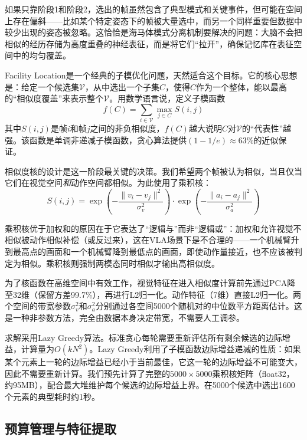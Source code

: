 \documentclass[11pt,a4paper,fontset=none]{ctexart}
\begin{document}
如果只靠阶段1和阶段2，选出的帧虽然包含了典型模式和关键事件，但可能在空间上存在偏斜——比如某个特定姿态下的帧被大量选中，而另一个同样重要但数据中较少出现的姿态被忽略。这恰恰是海马体模式分离机制要解决的问题：大脑不会把相似的经历存储为高度重叠的神经表征，而是将它们“拉开”，确保记忆库在表征空间中的均匀覆盖。

Facility Location是一个经典的子模优化问题，天然适合这个目标。它的核心思想是：给定一个候选集$\mathcal{V}$，从中选出一个子集$C$，使得$C$作为一个整体，能以最高的“相似度覆盖”来表示整个$\mathcal{V}$。用数学语言说，定义子模函数
\begin{equation}
f(C) = \sum_{i \in \mathcal{V}} \max_{j \in C} S(i,j)
\end{equation}
其中$S(i,j)$是帧$i$和帧$j$之间的非负相似度，$f(C)$越大说明$C$对$\mathcal{V}$的“代表性”越强。该函数是单调非递减子模函数，贪心算法提供$(1-1/e)\approx63\%$的近似保证。

相似度核的设计是这一阶段最关键的决策。我们希望两个帧被认为相似，当且仅当它们在视觉空间\textit{和}动作空间都相似。为此使用了乘积核：
\begin{equation}
S(i,j) = \exp\!\left(-\frac{\|v_i-v_j\|^2}{\sigma_v^2}\right) \cdot \exp\!\left(-\frac{\|a_i-a_j\|^2}{\sigma_a^2}\right)
\end{equation}

乘积核优于加权和的原因在于它表达了“逻辑与”而非“逻辑或”：加权和允许视觉不相似被动作相似补偿（或反过来），这在VLA场景下是不合理的——一个机械臂升到最高点的画面和一个机械臂降到最低点的画面，即使动作量接近，也不应该被判定为相似。乘积核则强制两模态同时相似才输出高相似度。

为了核函数在高维空间中有效工作，视觉特征在进入相似度计算前先通过PCA降至32维（保留方差99.7\%），再进行L2归一化。动作特征（7维）直接L2归一化。两个空间的带宽参数$\sigma_v^2$和$\sigma_a^2$分别通过各空间5000个随机对的中位数平方距离估计。这是一种非参数方法，完全由数据本身决定带宽，不需要人工调参。

求解采用Lazy Greedy算法。标准贪心每轮需要重新评估所有剩余候选的边际增益，计算量为$O(kN^2)$。Lazy Greedy利用了子模函数边际增益递减的性质：如果某个元素上一轮的边际增益已经小于当前最佳，它这一轮的边际增益不可能变大，因此不需要重新计算。我们预先计算了完整的$5000\times5000$乘积核矩阵（float32，约95MB），配合最大堆维护每个候选的边际增益上界。在5000个候选中选出1600个元素的典型耗时约1秒。

\subsection{预算管理与特征提取}
\end{document}
